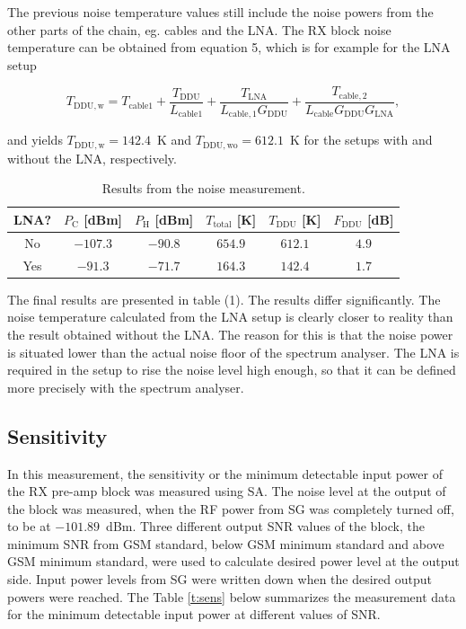 \documentclass[a4paper, 12pt]{article}
\begin{document}
The previous noise temperature values still include the noise powers from the other parts of the chain, eg. cables and the LNA. The RX block noise temperature can be obtained from equation 5, which is for example for the LNA setup

\begin{equation}
T_\mathrm{DDU, w} = T_\mathrm{cable 1} + \frac{T_\mathrm{DDU}}{L_\mathrm{cable 1}} + \frac{T_\mathrm{LNA}}{L_\mathrm{cable, 1} G_\mathrm{DDU}} + \frac{T_\mathrm{cable, 2}}{L_\mathrm{cable} G_\mathrm{DDU} G_\mathrm{LNA}},
\end{equation}

\noindent
and yields $T_{\mathrm{DDU, w}} = 142.4$~K and $T_{\mathrm{DDU, wo}} = 612.1$~K for the setups with and without the LNA, respectively.

\begin{table}[!h]
	\begin{center}
	\caption{Results from the noise measurement.}
	\label{t:noise}
	\renewcommand*{\arraystretch}{1.2}
	\begin{tabular}{cccccc}
	LNA? 			& $P_\mathrm{C}$ [dBm] 		& $P_\mathrm{H}$ [dBm]	& $T_\mathrm{total}$ [K] 	& $T_\mathrm{DDU}$ [K] 	& $F_\mathrm{DDU}$ [dB] \\
	\hline
	No				& $-107.3$					& $-90.8$				& $654.9$ 							& $612.1$ 						& $4.9$\\
	Yes				& $-91.3$					& $-71.7$				& $164.3$ 							& $142.4$ 						& $1.7$ 	
	\end{tabular}
	\end{center}
	\vspace*{-12pt}
\end{table}


The final results are presented in table (1). The results differ significantly. The noise temperature calculated from the LNA setup is clearly closer to reality than the result obtained without the LNA. The reason for this is that the noise power is situated lower than the actual noise floor of the spectrum analyser. The LNA is required in the setup to rise the noise level high enough, so that it can be defined more precisely with the spectrum analyser.

\subsection{Sensitivity}

In this measurement, the sensitivity or the minimum detectable input power of the RX pre-amp block was measured using SA. The noise level at the output of the block was measured, when the RF power from SG was completely turned off, to be at $-101.89$~dBm. Three different output SNR values of the block, the minimum SNR from GSM standard, below GSM minimum standard and above GSM minimum standard, were used to calculate desired power level at the output side. Input power levels from SG were written down when the desired output powers were reached. The Table \ref{t:sens} below summarizes the measurement data for the minimum detectable input power at different values of SNR.
\end{document}
